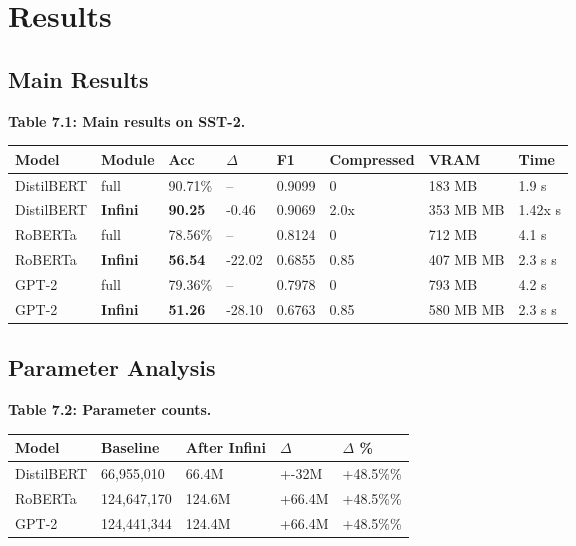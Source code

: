 \section{Results}

\subsection{Main Results}

\textbf{Table 7.1: Main results on SST-2.}

\begin{table}[H]
\centering
\small
\begin{tabular}{llllllll}
\toprule
\textbf{Model} & \textbf{Module} & \textbf{Acc} & \textbf{$\Delta$} & \textbf{F1} & \textbf{Compressed} & \textbf{VRAM} & \textbf{Time} \\
\midrule
DistilBERT & full & 90.71\% & -- & 0.9099 & 0 & 183 MB & 1.9 s \\
DistilBERT & \textbf{Infini} & \textbf{90.25} & -0.46 & 0.9069 & 2.0x & 353 MB MB & 1.42x s \\
RoBERTa & full & 78.56\% & -- & 0.8124 & 0 & 712 MB & 4.1 s \\
RoBERTa & \textbf{Infini} & \textbf{56.54} & -22.02 & 0.6855 & 0.85 & 407 MB MB & 2.3 s s \\
GPT-2 & full & 79.36\% & -- & 0.7978 & 0 & 793 MB & 4.2 s \\
GPT-2 & \textbf{Infini} & \textbf{51.26} & -28.10 & 0.6763 & 0.85 & 580 MB MB & 2.3 s s \\
\bottomrule
\end{tabular}
\end{table}

\subsection{Parameter Analysis}

\textbf{Table 7.2: Parameter counts.}

\begin{table}[H]
\centering
\small
\begin{tabular}{lllll}
\toprule
\textbf{Model} & \textbf{Baseline} & \textbf{After Infini} & \textbf{$\Delta$} & \textbf{$\Delta$ \%} \\
\midrule
DistilBERT & 66,955,010 & 66.4M & +-32M & +48.5\%\% \\
RoBERTa & 124,647,170 & 124.6M & +66.4M & +48.5\%\% \\
GPT-2 & 124,441,344 & 124.4M & +66.4M & +48.5\%\% \\
\bottomrule
\end{tabular}
\end{table}

